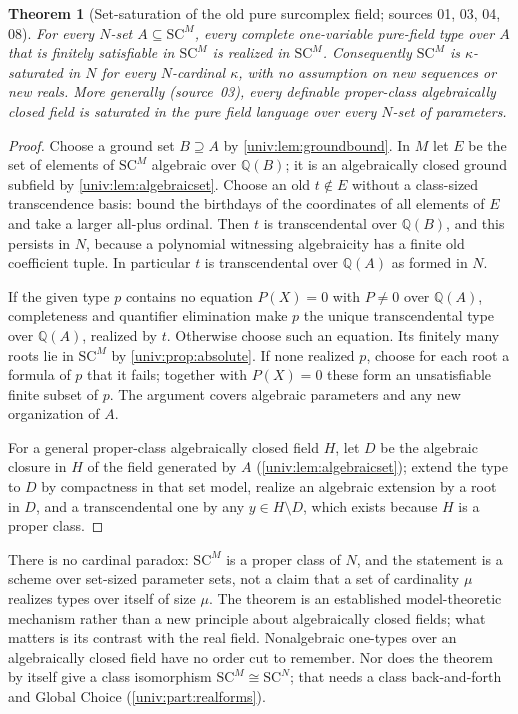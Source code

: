 \documentclass[11pt,letterpaper]{article}
\numberwithin{equation}{section}
\newtheorem{theorem}{Theorem}[section]
\theoremstyle{definition}
\theoremstyle{remark}
\newcommand{\SC}{\mathrm{SC}}
\newcommand{\SCM}{\SC^{M}}
\newcommand{\SCN}{\SC^{N}}
\newcommand{\Q}{\mathbb Q}
\begin{document}
\begin{theorem}[Set-saturation of the old pure surcomplex field; sources 01, 03, 04, 08]\label{univ:thm:purecomplex}
For every $N$-set $A\subseteq\SCM$, every complete one-variable pure-field type
over $A$ that is finitely satisfiable in $\SCM$ is realized in $\SCM$.
Consequently $\SCM$ is $\kappa$-saturated in $N$ for every $N$-cardinal
$\kappa$, with no assumption on new sequences or new reals. More generally
\textup{(source~03)}, every definable proper-class algebraically closed field is
saturated in the pure field language over every $N$-set of parameters.
\end{theorem}
\begin{proof}
Choose a ground set $B\supseteq A$ by \cref{univ:lem:groundbound}. In $M$ let
$E$ be the set of elements of $\SCM$ algebraic over $\Q(B)$; it is an
algebraically closed ground subfield by \cref{univ:lem:algebraicset}. Choose an
old $t\notin E$ without a class-sized transcendence basis: bound the birthdays
of the coordinates of all elements of $E$ and take a larger all-plus ordinal.
Then $t$ is transcendental over $\Q(B)$, and this persists in $N$, because a
polynomial witnessing algebraicity has a finite old coefficient tuple. In
particular $t$ is transcendental over $\Q(A)$ as formed in $N$.

If the given type $p$ contains no equation $P(X)=0$ with $P\ne0$ over $\Q(A)$,
completeness and quantifier elimination make $p$ the unique transcendental
type over $\Q(A)$, realized by $t$. Otherwise choose such an equation. Its
finitely many roots lie in $\SCM$ by \cref{univ:prop:absolute}. If none realized
$p$, choose for each root a formula of $p$ that it fails; together with
$P(X)=0$ these form an unsatisfiable finite subset of $p$. The argument covers
algebraic parameters and any new organization of $A$.

For a general proper-class algebraically closed field $H$, let $D$ be the
algebraic closure in $H$ of the field generated by $A$
(\cref{univ:lem:algebraicset}); extend the type to $D$ by compactness in that
set model, realize an algebraic extension by a root in $D$, and a
transcendental one by any $y\in H\setminus D$, which exists because $H$ is a
proper class.
\end{proof}

There is no cardinal paradox: $\SCM$ is a proper class of $N$, and the
statement is a scheme over set-sized parameter sets, not a claim that a set of
cardinality $\mu$ realizes types over itself of size $\mu$. The theorem is an
established model-theoretic mechanism rather than a new principle about
algebraically closed fields; what matters is its contrast with the real
field. Nonalgebraic one-types over an algebraically closed field have no order
cut to remember. Nor does the theorem by itself give a class isomorphism
$\SCM\cong\SCN$; that needs a class back-and-forth and Global Choice
(\cref{univ:part:realforms}).
\end{document}
